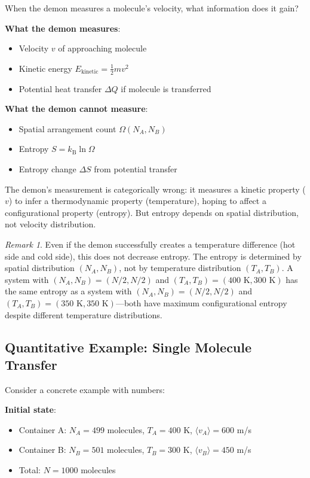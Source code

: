 \documentclass[10pt,twocolumn,letterpaper]{article}
\theoremstyle{definition}
\theoremstyle{remark}
\newtheorem{remark}[theorem]{Remark}
\newcommand{\kb}{k_\text{B}}
\newcommand{\Om}{\Omega}
\begin{document}
When the demon measures a molecule's velocity, what information does it gain?

\textbf{What the demon measures}:
\begin{itemize}
\item Velocity $v$ of approaching molecule
\item Kinetic energy $E_{\text{kinetic}} = \frac{1}{2}mv^2$
\item Potential heat transfer $\Delta Q$ if molecule is transferred
\end{itemize}

\textbf{What the demon cannot measure}:
\begin{itemize}
\item Spatial arrangement count $\Om(N_A, N_B)$
\item Entropy $S = \kb \ln \Om$
\item Entropy change $\Delta S$ from potential transfer
\end{itemize}

The demon's measurement is categorically wrong: it measures a kinetic property ($v$) to infer a thermodynamic property (temperature), hoping to affect a configurational property (entropy). But entropy depends on spatial distribution, not velocity distribution.

\begin{remark}
Even if the demon successfully creates a temperature difference (hot side and cold side), this does not decrease entropy. The entropy is determined by spatial distribution $(N_A, N_B)$, not by temperature distribution $(T_A, T_B)$. A system with $(N_A, N_B) = (N/2, N/2)$ and $(T_A, T_B) = (400\text{ K}, 300\text{ K})$ has the same entropy as a system with $(N_A, N_B) = (N/2, N/2)$ and $(T_A, T_B) = (350\text{ K}, 350\text{ K})$—both have maximum configurational entropy despite different temperature distributions.
\end{remark}

\subsection{Quantitative Example: Single Molecule Transfer}

Consider a concrete example with numbers:

\textbf{Initial state}:
\begin{itemize}
\item Container A: $N_A = 499$ molecules, $T_A = 400$ K, $\langle v_A \rangle = 600$ m/s
\item Container B: $N_B = 501$ molecules, $T_B = 300$ K, $\langle v_B \rangle = 450$ m/s
\item Total: $N = 1000$ molecules
\end{itemize}
\end{document}
